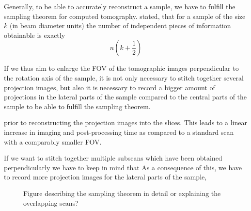 Generally, to be able to accurately reconstruct a sample, we have to fulfill the sampling theorem for computed tomography. \citet{Cormack1978} stated, that for a sample of the size $k$ (in beam diameter units) the number of independent pieces of information obtainable is exactly
\begin{equation}
n(k+\frac{1}{2})%
\end{equation}

If we thus aim to enlarge the FOV of the tomographic images perpendicular to the rotation axis of the sample, it is not only necessary to stitch together several projection images, but also it is necessary to record a bigger amount of projections in the lateral parts of the sample compared to the central parts of the sample to be able to fulfill the sampling theorem. 

prior to reconstructing the projection images into the slices. This leads to a linear increase in imaging and post-processing time as compared to a standard scan with a comparably smaller FOV. 

If we want to stitch together multiple subscans which have been obtained perpendicularly we have to keep in mind that As a consequence of this, we have to record more projection images for the lateral parts of the sample, 

\begin{figure}[tb]
	\centering
	\label{fig:sampling theorem}
	\caption{Figure describing the sampling theorem in detail or explaining the overlapping scans?}
\end{figure}